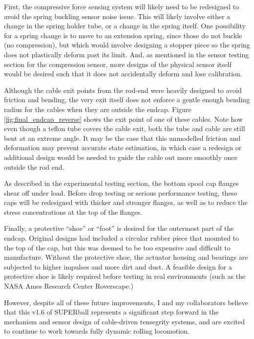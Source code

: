 \documentclass[12pt]{report}
\begin{document}
First, the compressive force sensing system will likely need to be redesigned to avoid the spring buckling sensor noise issue.
This will likely involve either a change in the spring holder tube, or a change in the spring itself.
One possibility for a spring change is to move to an extension spring, since those do not buckle (no compression), but which would involve designing a stopper piece so the spring does not plastically deform past its limit.
And, as mentioned in the sensor testing section for the compression sensor, more designs of the physical sensor itself would be desired such that it does not accidentally deform and lose calibration.

Although the cable exit points from the rod-end were heavily designed to avoid friction and bending, the very exit itself does not enforce a gentle enough bending radius for the cables when they are outside the endcap.
Figure \ref{fig:final_endcap_reverse} shows the exit point of one of these cables.
Note how even though a teflon tube covers the cable exit, both the tube and cable are still bent at an extreme angle.
It may be the case that this unmodelled friction and deformation may prevent accurate state estimation, in which case a redesign or additional design would be needed to guide the cable out more smoothly once outside the rod end.

As described in the experimental testing section, the bottom spool cap flanges shear off under load.
Before drop testing or serious performance testing, these caps will be redesigned with thicker and stronger flanges, as well as to reduce the stress concentrations at the top of the flanges.

Finally, a protective ``shoe'' or ``foot'' is desired for the outermost part of the endcap.
Original designs had included a circular rubber piece that mounted to the top of the cap, but this was deemed to be too expensive and difficult to manufacture.
Without the protective shoe, the actuator housing and bearings are subjected to higher impulses and more dirt and dust.
A feasible design for a protective shoe is likely required before testing in real environments (such as the NASA Ames Research Center Roverscape.)

However, despite all of these future improvements, I and my collaborators believe that this v1.6 of SUPERball represents a significant step forward in the mechanism and sensor design of cable-driven tensegrity systems, and are excited to continue to work towards fully dynamic rolling locomotion.
\end{document}
